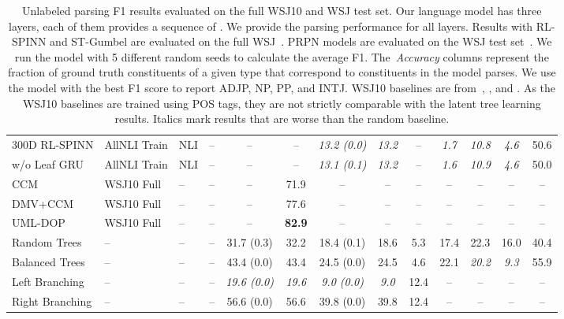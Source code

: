 \documentclass{article} \usepackage{iclr2019_conference,times}
\begin{document}
\begin{table*}[t]
{\begin{tabular}{llllccccccccc}
300D RL-SPINN & AllNLI Train & NLI & -- &  -- & -- & \it 13.2 (0.0) & \it 13.2 & -- & \it 1.7 & \it 10.8 & \it 4.6 & 50.6  \\
\hspace{1em} w/o Leaf GRU & AllNLI Train & NLI & -- & -- & -- & \it 13.1 (0.1) & \it 13.2 & --  & \it 1.6 & \it 10.9 & \it 4.6 & 50.0 \\
\midrule 
CCM   &  WSJ10 Full & -- & -- & -- & 71.9 & -- & -- & -- & -- & -- & -- & -- \\
DMV+CCM  & WSJ10 Full & -- & -- & -- & 77.6 & -- &  -- & -- & -- & -- & -- & -- \\
UML-DOP &   WSJ10 Full & -- & -- & -- & \bf 82.9 & -- & -- & -- & -- & -- & -- & --  \\
\midrule
Random Trees & --  & -- & -- & 31.7 (0.3) & 32.2 & 18.4 (0.1) & 18.6 & 5.3 &17.4 & 22.3 & 16.0 & 40.4 \\
Balanced Trees & -- & -- & -- & 43.4 (0.0) & 43.4 & 24.5 (0.0) & 24.5 & 4.6 & 22.1 & \textit{20.2} & \textit{9.3} & 55.9 \\
Left Branching & --  & -- & -- & \it 19.6 (0.0) & \it 19.6 & \it 9.0 (0.0) & \it 9.0 & 12.4 & -- & -- & -- & --  \\
Right Branching &  -- & -- & -- & 56.6 (0.0) & 56.6 & 39.8 (0.0) & 39.8  &  12.4 & -- & -- & -- & --  \\
\bottomrule 
\end{tabular}
}
\caption{ Unlabeled parsing F1 results evaluated on the full WSJ10 and WSJ test set. 
Our language model has three layers, each of them provides a sequence of . 
We provide the parsing performance for all layers.
Results with RL-SPINN and ST-Gumbel are evaluated on the full WSJ~\citep{williams2017broad}. 
PRPN models are evaluated on the WSJ test set~\citep{htut2018grammar}. We run the model with 5 different random seeds to calculate the average F1. The~\textit{Accuracy} columns represent the fraction of ground truth constituents of a given type that correspond to constituents in the model parses.
We use the model with the best F1 score to report ADJP, NP, PP, and INTJ.
WSJ10 baselines are from~\citet[][CCM]{klein2002generative}, \citet[][DMV+CCM]{klein2005natural}, and \citet[][UML-DOP]{bod2006all}.
As the WSJ10 baselines are trained using POS tags, they are not strictly comparable with the latent tree learning results.
Italics mark results that are worse than the random baseline.
}
\label{tab:wsj-table}
\end{table*} 
\end{document}

